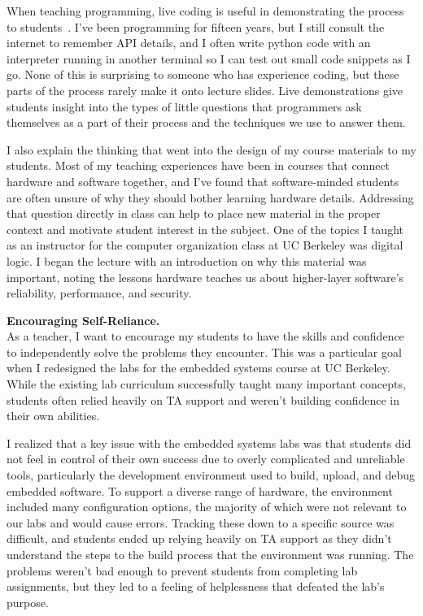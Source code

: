 \documentclass[11pt]{article} %
\begin{document}
When teaching programming, live coding is useful in demonstrating the process
to students~\footnotemark{}. I've been programming for fifteen years, but I still
consult the internet to remember API details, and I often write python code
with an interpreter running in another terminal so I can test out small code
snippets as I go. None of this is surprising to someone who has experience
coding, but these parts of the process rarely make it onto lecture slides. Live
demonstrations give students insight into the types of little questions that
programmers ask themselves as a part of their process and the techniques we use
to answer them.


I also explain the thinking that went into the design of my course materials
to my students.
%
Most of my teaching experiences have been in courses that connect hardware and
software together, and I've found that software-minded students are often
unsure of why they should bother learning hardware details. Addressing that
question directly in class can help to place new material in the proper context
and motivate student interest in the subject.
%
One of the topics I taught as an instructor for the computer organization class
at UC Berkeley was digital logic. I began the lecture with an introduction on
why this material was important, noting the lessons hardware teaches us about
higher-layer software's reliability, performance, and security.


\bigskip
\textbf{\textsf{\large Encouraging Self-Reliance.}}\\
As a teacher, I want to encourage my students to have the skills and confidence
to independently solve the problems they encounter.
%
This was a particular goal when I redesigned the labs for the embedded systems
course at UC Berkeley.
%
While the existing lab curriculum successfully taught many important concepts,
students often relied heavily on TA support and weren't building confidence in
their own abilities.

I realized that a key issue with the embedded systems labs was that students
did not feel in control of their own success due to overly complicated and
unreliable tools, particularly the development environment used to build,
upload, and debug embedded software. To support a diverse range of hardware,
the environment included many configuration options, the majority of which were
not relevant to our labs and would cause errors. Tracking these down to a
specific source was difficult, and students ended up relying heavily on TA
support as they didn't understand the steps to the build process that the
environment was running. The problems weren't bad enough to prevent students
from completing lab assignments, but they led to a feeling of helplessness
that defeated the lab's purpose.
\end{document}
